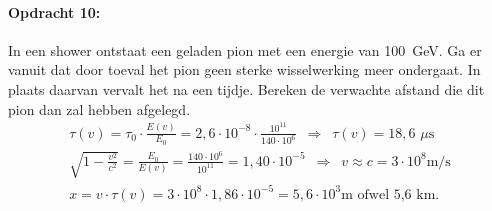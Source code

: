 \begin{minipage}[t]{1\columnwidth}
\paragraph{Opdracht 10:}
In een shower ontstaat een geladen pion met een energie van \SI{100}{\giga\electronvolt}. Ga er vanuit dat door toeval het pion geen sterke wisselwerking meer ondergaat. In plaats daarvan vervalt het na een tijdje. Bereken de verwachte afstand die dit pion dan zal hebben afgelegd.
\begin{eqnarray}  
\tau (v) = \tau_0 \cdot \frac{E(v)}{E_0}=2,6 \cdot 10^{-8} \cdot \frac{10^{11}}{140 \cdot 10^6} \, \, \,  \Rightarrow \, \, \, \tau (v) = 18,6 \,\, \mu \textrm{s} \nonumber \\
\sqrt{1-\frac{v^2}{c^2}} = \frac{E_0}{E(v)}= \frac{140 \cdot 10^6}{10^{11}} = 1,40 \cdot 10^{-5} \, \, \,  \Rightarrow \, \, \, v \approx c = 3 \cdot 10^8 \textrm{m/s} \nonumber \\ 
x=v \cdot \tau(v) = 3 \cdot 10^8 \cdot 1,86 \cdot 10^{-5}=5,6 \cdot 10^3 \textrm{m  ofwel  5,6 km}. \nonumber
\end{eqnarray}

\end{minipage}




